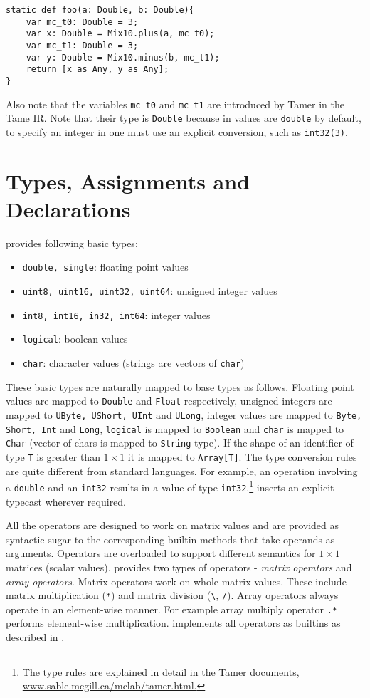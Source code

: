 \begin{lstlisting}[language=X10,numbers=none]
static def foo(a: Double, b: Double){
    var mc_t0: Double = 3;
    var x: Double = Mix10.plus(a, mc_t0);
    var mc_t1: Double = 3;
    var y: Double = Mix10.minus(b, mc_t1);
    return [x as Any, y as Any];
}
\end{lstlisting}

Also note that the variables \verb|mc_t0| and \verb|mc_t1| are introduced by
Tamer in the Tame IR. Note that their type is \verb|Double| because in
\matlab values are \verb|double| by default,  to specify an integer in
\matlab one must use an explicit conversion, such as \verb|int32(3)|. 

\section{Types, Assignments and Declarations}

\matlab provides following basic types:
\begin{itemize}
\item \verb|double, single|: floating point values
\item \verb|uint8, uint16, uint32, uint64|: unsigned integer values 
\item \verb|int8, int16, in32, int64|:	integer values
\item \verb|logical|: boolean values
\item \verb|char|: character values (strings are vectors of \verb|char|)
\end{itemize}

These basic types are naturally mapped to \xten base types as follows.
Floating point values are mapped to \verb|Double| and \verb|Float|
respectively, unsigned integers are mapped to \verb|UByte, UShort, UInt|
and \verb|ULong|, integer values are mapped to \verb|Byte, Short, Int|
and \verb|Long|, \verb|logical| is mapped to \verb|Boolean| and
\verb|char| is mapped to \verb|Char| (vector of chars is mapped to
\verb|String| type). If the shape of an identifier of type \verb|T| is
greater than $1\times1$ it is mapped to \verb|Array[T]|.  The type
conversion rules are quite different from standard languages.  For
example, an operation involving a \verb|double| and an \verb|int32|
results in a value of type \verb|int32|.\footnote{The type rules are
explained in detail in the Tamer documents,
\url{www.sable.mcgill.ca/mclab/tamer.html.}}  \mixten inserts an explicit
typecast wherever required.
  
All the \matlab operators are designed to work on matrix values and are
provided as syntactic sugar to the corresponding builtin methods that
take operands as arguments.  Operators are overloaded to support
different semantics for $1\times1$ matrices (scalar values). \matlab
provides two types of operators - \emph{matrix operators} and
\emph{array operators}. Matrix operators work on whole matrix values.
These include matrix multiplication (\verb+*+) and matrix division
(\verb+\+, \verb+/+). Array operators always operate in an element-wise
manner. For example array multiply operator \verb+.*+ performs
element-wise multiplication. \mixten implements all operators as
builtins as described in .

